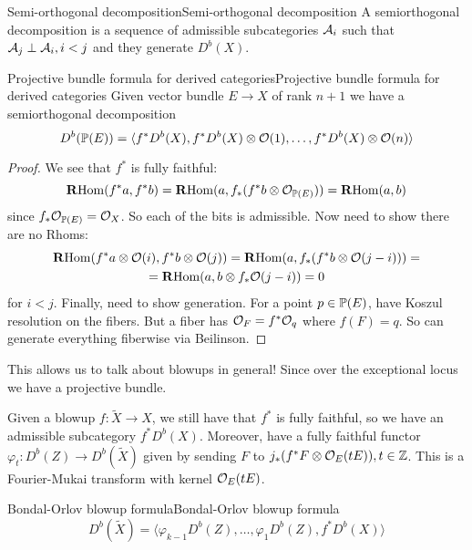 \begin{definition}{Semi-orthogonal decomposition}{Semi-orthogonal decomposition}
    A semiorthogonal decomposition is a sequence of admissible subcategories $\calA_{i}$ such that $\calA_{j}\perp \calA_{i}, i<j$ and they generate $D^b(X)$.
\end{definition}


\begin{proposition}{Projective bundle formula for derived categories}{Projective bundle formula for derived categories}
    Given vector bundle $E\rightarrow X$ of rank $n+1$ we have a semiorthogonal decomposition $$D^b(\P(E))=\langle f^*D^b(X), f^*D^b(X)\otimes \O(1),\dots, f^*D^b(X)\otimes \O(n)\rangle$$
\end{proposition}

\begin{proof}
    We see that $f^*$ is fully faithful: $$\RHom(f^*a,f^*b)=\RHom(a, f_{*} (f^*b\otimes \O_{\P(E)}))=\RHom(a, b)$$since $f_*\O_{\P(E)}=\O_{X}$. So each of the bits is admissible. Now need to show there are no Rhoms: $$\begin{gathered}
\RHom(f^*a\otimes \O(i), f^*b\otimes \O(j))=\RHom(a, f_{*}(f^*b\otimes \O(j-i)))=\\
=\RHom(a, b\otimes f_{*}\O(j-i))=0
\end{gathered}$$for $i<j$. Finally, need to show generation. For a point $p\in \P(E)$, have Koszul resolution on the fibers. But a fiber has $\O_{F}=f^*\O_{q}$ where $f(F)=q$. So can generate everything fiberwise via Beilinson.
\end{proof}

This allows us to talk about blowups in general! Since over the exceptional locus we have a projective bundle.

Given a blowup $f:\tilde{X}\to X$, we still have that $f^*$ is fully faithful, so we have an admissible subcategory $f^*D^b(X)$. Moreover, have a fully faithful functor $\varphi_{t}:D^b(Z)\to D^b(\tilde{X})$ given by sending $F$ to $j_{*}(f^*F\otimes \O_{E}(tE)), t\in \Z$. This is a Fourier-Mukai transform with kernel $\O_{E}(tE)$.


\begin{theorem}{Bondal-Orlov blowup formula}{Bondal-Orlov blowup formula}
    $$D^b(\tilde{X})=\langle \varphi_{{k-1}}D^b(Z),\dots,\varphi_{1}D^b(Z), f^*D^b(X)\rangle$$
\end{theorem}

